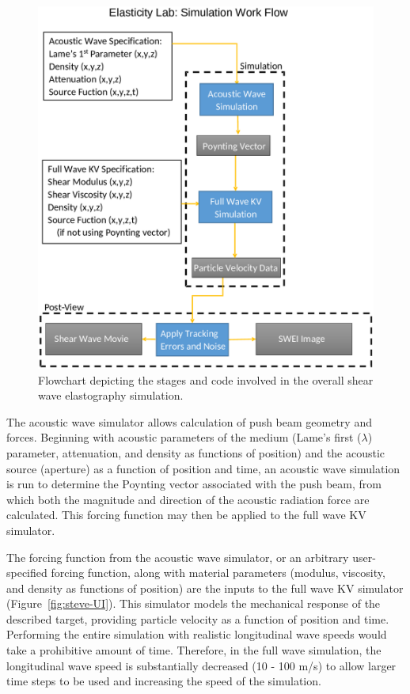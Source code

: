 \begin{figure}[htb!]
    \centering
    \includegraphics[width=0.75\linewidth]{steve/figs/image3.png}
    \caption{Flowchart depicting the stages and code involved in the overall
    shear wave elastography simulation.} 
\label{fig:steve-sim-flowchart}
\end{figure}

The acoustic wave simulator allows calculation of push beam geometry and
forces. Beginning with acoustic parameters of the medium (Lame’s first
($\lambda$) parameter, attenuation, and density as functions of position) and
the acoustic source (aperture) as a function of position and time, an acoustic
wave simulation is run to determine the Poynting vector associated with the
push beam, from which both the magnitude and direction of the acoustic
radiation force are calculated.  This forcing function may then be applied to
the full wave KV simulator. 

The forcing function from the acoustic wave simulator, or an arbitrary
user-specified forcing function, along with material parameters (modulus,
viscosity, and density as functions of position) are the inputs to the full
wave KV simulator (Figure~\ref{fig:steve-UI}). This simulator models the
mechanical response of the described target, providing particle velocity as a
function of position and time. Performing the entire simulation with realistic
longitudinal wave speeds would take a prohibitive amount of time. Therefore, in
the full wave simulation, the longitudinal wave speed is substantially
decreased (10 - 100 m/s) to allow larger time steps to be used and increasing
the speed of the simulation. 

